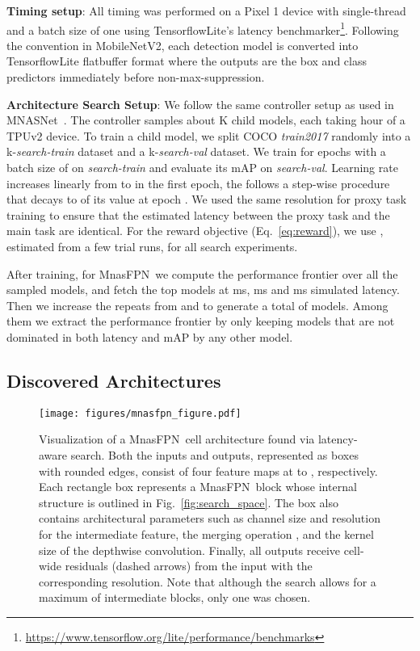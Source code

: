 \documentclass[10pt,twocolumn,letterpaper]{article}
\def\Mnasfpn{MnasFPN~}
\begin{document}
{\bf Timing setup}:
All timing was performed on a Pixel 1 device with single-thread and a batch size of one using TensorflowLite's latency benchmarker\footnote{\url{https://www.tensorflow.org/lite/performance/benchmarks}}. Following the convention in MobileNetV2\cite{sandler2018mobilenetv2}, each detection model is converted into TensorflowLite flatbuffer format where the outputs are the box and class predictors immediately before non-max-suppression. 


{\bf Architecture Search Setup}:
We follow the same controller setup as used in MNASNet~\cite{tan2019mnasnet}. The controller samples about K child models, each taking  hour of a TPUv2 device. To train a child model, we split COCO {\it train2017} randomly into a k-{\it search-train} dataset and a k-{\it search-val} dataset. We train for  epochs with a batch size of  on {\it search-train} and evaluate its mAP on {\it search-val}. Learning rate increases linearly from  to  in the first epoch, the follows a step-wise procedure that decays to  of its value at epoch . We used the same  resolution for proxy task training to ensure that the estimated latency between the proxy task and the main task are identical. For the reward objective (Eq.~\ref{eq:reward}), we use , estimated from a few trial runs, for all search experiments.


After training, for \Mnasfpn we compute the performance frontier over all the sampled models, and fetch the top models at  ms,  ms and  ms simulated latency. Then we increase the repeats from  and  to generate a  total of  models. Among them we extract the performance frontier by only keeping models that are not dominated in both latency and mAP by any other model. 




\subsection{Discovered Architectures}
\label{sec:arch}




\begin{figure}[!t]
    \centering
    \texttt{[image: figures/mnasfpn\_figure.pdf]}
    \caption{Visualization of a \Mnasfpn cell architecture found via latency-aware search. Both the inputs and outputs, represented as boxes with rounded edges, consist of four feature maps at  to , respectively. Each rectangle box represents a \Mnasfpn block whose internal structure is outlined in Fig.~\ref{fig:search_space}. The box also contains architectural parameters such as channel size  and resolution  for the intermediate feature, the merging operation , and the kernel size  of the depthwise convolution. Finally, all outputs receive cell-wide residuals (dashed arrows) from the input with the corresponding resolution. Note that although the search allows for a maximum of  intermediate blocks, only one was chosen.}
    \label{fig:arch}
\end{figure}
\end{document}
